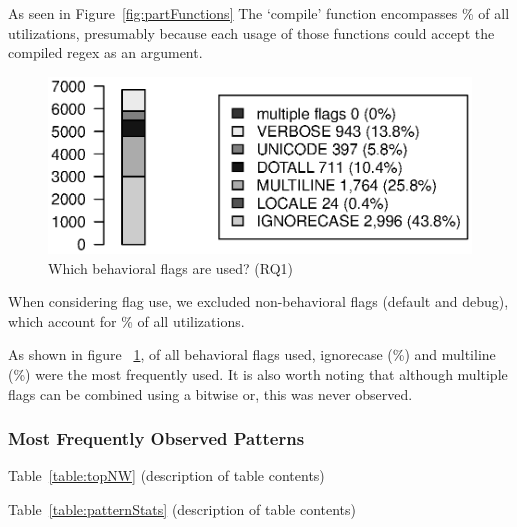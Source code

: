 As seen in Figure~\ref{fig:partFunctions} The `compile' function encompasses \% of all utilizations, presumably because each usage of those functions could accept the compiled regex as an argument.

\begin{figure}[tb]
\centering
\includegraphics[width=\columnwidth]{../analysis_output/partFlags.eps}
\caption{Which behavioral flags are used? (RQ1)}
\label{fig:partFlags}
\end{figure}

When considering flag use, we excluded non-behavioral flags (default and debug), which account for \% of all utilizations.

 As shown in figure ~\ref{fig:partFlags}, of all behavioral flags used, ignorecase (\%) and multiline (\%) were the most frequently used.  It is also worth noting that although multiple flags can be combined using a bitwise or, this was never observed.


\subsubsection{Most Frequently Observed Patterns}

Table~\ref{table:topNW} (description of table contents)




Table~\ref{table:patternStats} (description of table contents)





